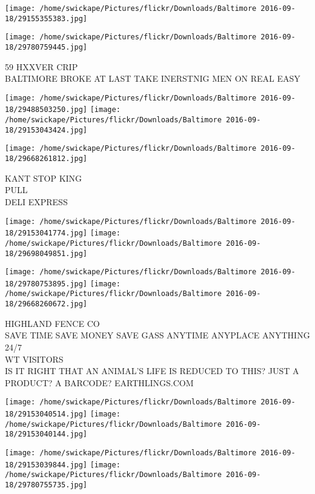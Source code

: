 \documentclass[10pt,letterpaper]{article}
\begin{document}
\texttt{[image: /home/swickape/Pictures/flickr/Downloads/Baltimore 2016-09-18/29155355383.jpg]}

\vspace{0.25in}
\texttt{[image: /home/swickape/Pictures/flickr/Downloads/Baltimore 2016-09-18/29780759445.jpg]}

59 HXXVER CRIP\\
BALTIMORE BROKE AT LAST TAKE INERSTNIG MEN ON REAL EASY\\
\pagebreak

\texttt{[image: /home/swickape/Pictures/flickr/Downloads/Baltimore 2016-09-18/29488503250.jpg]}
\texttt{[image: /home/swickape/Pictures/flickr/Downloads/Baltimore 2016-09-18/29153043424.jpg]}

\vspace{0.25in}
\texttt{[image: /home/swickape/Pictures/flickr/Downloads/Baltimore 2016-09-18/29668261812.jpg]}

KANT STOP KING\\
PULL\\
DELI EXPRESS\\
\pagebreak

\texttt{[image: /home/swickape/Pictures/flickr/Downloads/Baltimore 2016-09-18/29153041774.jpg]}
\texttt{[image: /home/swickape/Pictures/flickr/Downloads/Baltimore 2016-09-18/29698049851.jpg]}

\texttt{[image: /home/swickape/Pictures/flickr/Downloads/Baltimore 2016-09-18/29780753895.jpg]}
\texttt{[image: /home/swickape/Pictures/flickr/Downloads/Baltimore 2016-09-18/29668260672.jpg]}

HIGHLAND FENCE CO\\
SAVE TIME SAVE MONEY SAVE GASS ANYTIME ANYPLACE ANYTHING 24/7\\
WT VISITORS\\
IS IT RIGHT THAT AN ANIMAL'S LIFE IS REDUCED TO THIS?  JUST A PRODUCT?  A BARCODE?  EARTHLINGS.COM\\
\pagebreak

\texttt{[image: /home/swickape/Pictures/flickr/Downloads/Baltimore 2016-09-18/29153040514.jpg]}
\texttt{[image: /home/swickape/Pictures/flickr/Downloads/Baltimore 2016-09-18/29153040144.jpg]}

\texttt{[image: /home/swickape/Pictures/flickr/Downloads/Baltimore 2016-09-18/29153039844.jpg]}
\texttt{[image: /home/swickape/Pictures/flickr/Downloads/Baltimore 2016-09-18/29780755735.jpg]}
\end{document}
